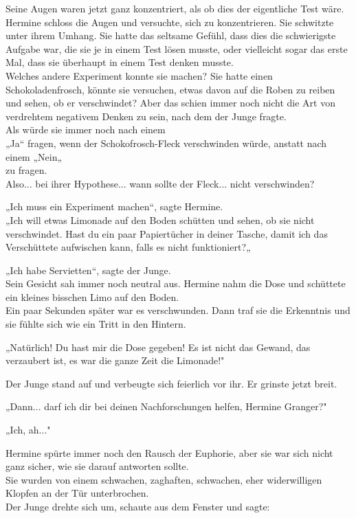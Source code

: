 {Seine Augen waren jetzt ganz konzentriert, als ob dies der eigentliche Test wäre.\\ Hermine schloss die Augen und versuchte, sich zu konzentrieren. Sie schwitzte unter ihrem Umhang. Sie hatte das seltsame Gefühl, dass dies die schwierigste Aufgabe war, die sie je in einem Test lösen musste, oder vielleicht sogar das erste Mal, dass sie überhaupt in einem Test denken musste.\\ Welches andere Experiment konnte sie machen? Sie hatte einen Schokoladenfrosch, könnte sie versuchen, etwas davon auf die Roben zu reiben und sehen, ob er verschwindet? Aber das schien immer noch nicht die Art von verdrehtem negativem Denken zu sein, nach dem der Junge fragte.\\ Als würde sie immer noch nach einem\\ „Ja“ fragen, wenn der Schokofrosch-Fleck verschwinden würde, anstatt nach einem „Nein„\\ zu fragen.\\ Also... bei ihrer Hypothese... wann sollte der Fleck... nicht verschwinden?

„Ich muss ein Experiment machen“, sagte Hermine.\\ „Ich will etwas Limonade auf den Boden schütten und sehen, ob sie nicht verschwindet. Hast du ein paar Papiertücher in deiner Tasche, damit ich das Verschüttete aufwischen kann, falls es nicht funktioniert?„

„Ich habe Servietten“, sagte der Junge.\\ Sein Gesicht sah immer noch neutral aus. Hermine nahm die Dose und schüttete ein kleines bisschen Limo auf den Boden.\\ Ein paar Sekunden später war es verschwunden. Dann traf sie die Erkenntnis und sie fühlte sich wie ein Tritt in den Hintern.

„Natürlich! Du hast mir die Dose gegeben! Es ist nicht das Gewand, das verzaubert ist, es war die ganze Zeit die Limonade!"

Der Junge stand auf und verbeugte sich feierlich vor ihr. Er grinste jetzt breit.

„Dann... darf ich dir bei deinen Nachforschungen helfen, Hermine Granger?"

„Ich, ah..."

Hermine spürte immer noch den Rausch der Euphorie, aber sie war sich nicht ganz sicher, wie sie darauf antworten sollte.\\ Sie wurden von einem schwachen, zaghaften, schwachen, eher widerwilligen Klopfen an der Tür unterbrochen.\\ Der Junge drehte sich um, schaute aus dem Fenster und sagte:

}
